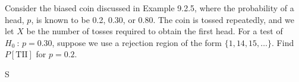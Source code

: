 \documentclass[answers]{exam}
\begin{document}
\begin{questions}
\begin{solution}
	
\end{solution}

\question 
Consider the biased coin discussed in Example 9.2.5, where the probability of a
head, \(p\), is known to be 0.2, 0.30, or 0.80. 
The coin is tossed repeatedly, and we let \(X\) be the number of tosses 
required to obtain the first head. For a test of \(H_0\ :\,p=0.30\), 
suppose we use a rejection region of the form \(\{1,14,15,\ldots\}\). 
Find \(P\left[\text{TII}\right]\) for \(p=0.2\).
\begin{solution}
	S
	
\end{solution}

\end{questions}
\end{document}
